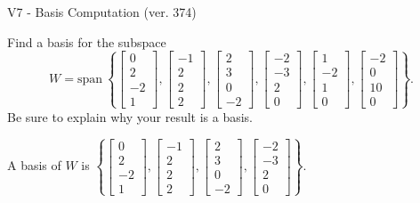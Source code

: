 \begin{exercise}
  \begin{exerciseTitle}V7 - Basis Computation (ver. 374)\end{exerciseTitle}
  \begin{exerciseStatement}
    Find a basis for the subspace 
\[W=\mathrm{span}\ \left\{\left[\begin{array}{r}
0 \\
2 \\
-2 \\
1
\end{array}\right] , \left[\begin{array}{r}
-1 \\
2 \\
2 \\
2
\end{array}\right] , \left[\begin{array}{r}
2 \\
3 \\
0 \\
-2
\end{array}\right] , \left[\begin{array}{r}
-2 \\
-3 \\
2 \\
0
\end{array}\right] , \left[\begin{array}{r}
1 \\
-2 \\
1 \\
0
\end{array}\right] , \left[\begin{array}{r}
-2 \\
0 \\
10 \\
0
\end{array}\right]\right\}.\]
 Be sure to explain why your result is a basis.


  \end{exerciseStatement}
  \begin{exerciseAnswer}
   A basis of \(W\) is  \(\left\{\left[\begin{array}{r}
0 \\
2 \\
-2 \\
1
\end{array}\right] , \left[\begin{array}{r}
-1 \\
2 \\
2 \\
2
\end{array}\right] , \left[\begin{array}{r}
2 \\
3 \\
0 \\
-2
\end{array}\right] , \left[\begin{array}{r}
-2 \\
-3 \\
2 \\
0
\end{array}\right]\right\}\).
  


  \end{exerciseAnswer}
\end{exercise}